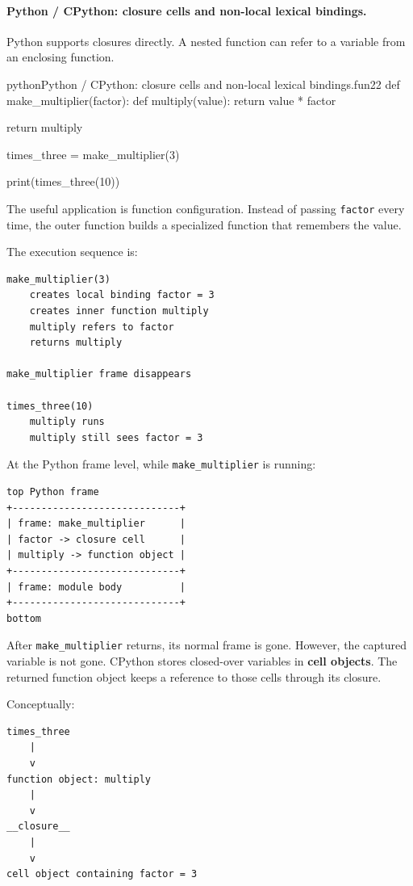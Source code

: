 \documentclass[a4paper,twoside]{report}
\begin{document}
\paragraph{Python / CPython: closure cells and non-local lexical bindings.}

Python supports closures directly. A nested function can refer to a variable from an enclosing function.

\begin{codebox}[]{python}{Python / CPython: closure cells and non-local lexical bindings.}{fun22}
def make_multiplier(factor):
    def multiply(value):
        return value * factor

    return multiply


times_three = make_multiplier(3)

print(times_three(10))
\end{codebox}


The useful application is function configuration. Instead of passing \texttt{factor} every time, the outer function builds a specialized function that remembers the value.

The execution sequence is:

\begin{verbatim}
make_multiplier(3)
    creates local binding factor = 3
    creates inner function multiply
    multiply refers to factor
    returns multiply

make_multiplier frame disappears

times_three(10)
    multiply runs
    multiply still sees factor = 3
\end{verbatim}

At the Python frame level, while \texttt{make\_multiplier} is running:

\begin{verbatim}
top Python frame
+-----------------------------+
| frame: make_multiplier      |
| factor -> closure cell      |
| multiply -> function object |
+-----------------------------+
| frame: module body          |
+-----------------------------+
bottom
\end{verbatim}

After \texttt{make\_multiplier} returns, its normal frame is gone. However, the captured variable is not gone. CPython stores closed-over variables in \textbf{cell objects}. The returned function object keeps a reference to those cells through its closure.

Conceptually:

\begin{verbatim}
times_three
    |
    v
function object: multiply
    |
    v
__closure__
    |
    v
cell object containing factor = 3
\end{verbatim}
\end{document}
